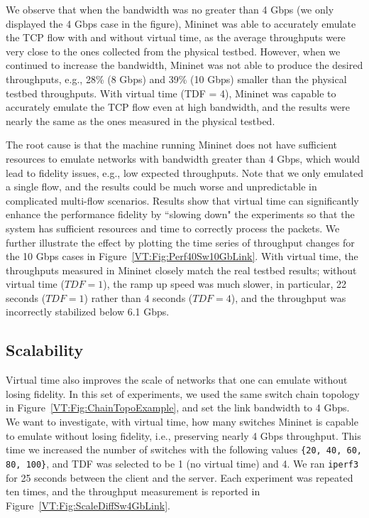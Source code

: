 We observe that when the bandwidth was no greater than 4 Gbps (we only displayed the 4 Gbps case in the figure),
Mininet was able to accurately emulate the TCP flow with and without virtual time,
as the average throughputs were very close to the ones collected from the physical testbed.
However, when we continued to increase the bandwidth, Mininet was not able to produce the desired throughputs, e.g.,
28\% (8 Gbps) and 39\% (10 Gbps) smaller than the physical testbed throughputs.
With virtual time (TDF = 4), Mininet was capable to accurately emulate the TCP flow even at high bandwidth,
and the results were nearly the same as the ones measured in the physical testbed. 

The root cause is that the machine running Mininet does not have sufficient resources to emulate networks with bandwidth greater than 4 Gbps,
which would lead to fidelity issues, e.g., low expected throughputs.
Note that we only emulated a single flow, and the results could be much worse and unpredictable in complicated multi-flow scenarios.
Results show that virtual time can significantly enhance the performance fidelity
by ``slowing down" the experiments so that the system has sufficient resources and time to correctly process the packets.
We further illustrate the effect by plotting the time series of throughput changes for the 10 Gbps cases in Figure~\ref{VT:Fig:Perf40Sw10GbLink}.
With virtual time, the throughputs measured in Mininet closely match the real testbed results;
without virtual time ($TDF = 1$), the ramp up speed was much slower, in particular,
22 seconds ($TDF = 1$) rather than 4 seconds ($TDF = 4$), and the throughput was incorrectly stabilized below 6.1 Gbps.

\subsection{Scalability}
Virtual time also improves the scale of networks that one can emulate without losing fidelity.
In this set of experiments, we used the same switch chain topology in Figure~\ref{VT:Fig:ChainTopoExample},
and set the link bandwidth to 4 Gbps. We want to investigate, with virtual time,
how many switches Mininet is capable to emulate without losing fidelity, i.e., preserving nearly 4 Gbps throughput.
This time we increased the number of switches with the following values \texttt{\{20, 40, 60, 80, 100\}},
and TDF was selected to be 1 (no virtual time) and 4. We ran \texttt{iperf3} for 25 seconds between the client and the server.
Each experiment was repeated ten times, and the throughput measurement is reported in Figure~\ref{VT:Fig:ScaleDiffSw4GbLink}.

